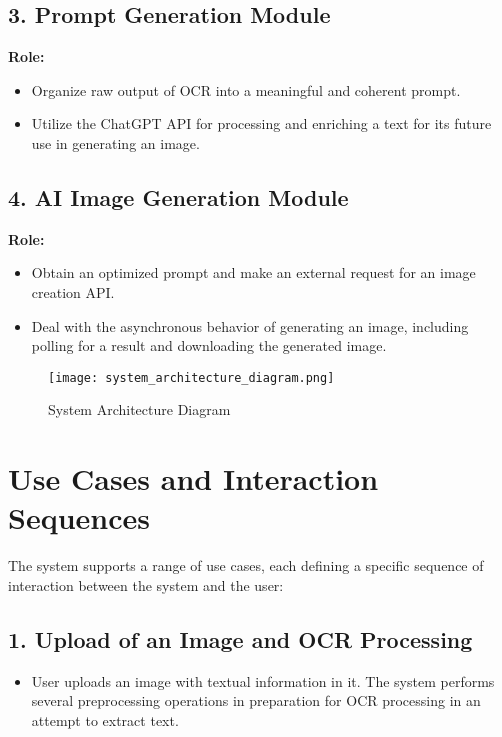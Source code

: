 \subsection*{3. Prompt Generation Module}
\textbf{Role:}
\begin{itemize}
    \item Organize raw output of OCR into a meaningful and coherent prompt.
    \item Utilize the ChatGPT API for processing and enriching a text for its future use in generating an image.
\end{itemize}

\subsection*{4. AI Image Generation Module}
\textbf{Role:}
\begin{itemize}
    \item Obtain an optimized prompt and make an external request for an image creation API.
    \item Deal with the asynchronous behavior of generating an image, including polling for a result and downloading the generated image.
\end{itemize}

\begin{figure}[h]
    \centering
    \texttt{[image: system\_architecture\_diagram.png]} %
    \caption{System Architecture Diagram}
    \label{fig:system_architecture}
\end{figure}

\section{Use Cases and Interaction Sequences}

The system supports a range of use cases, each defining a specific sequence of interaction between the system and the user:

\subsection*{1. Upload of an Image and OCR Processing}
\begin{itemize}
    \item User uploads an image with textual information in it. The system performs several preprocessing operations in preparation for OCR processing in an attempt to extract text.
\end{itemize}

